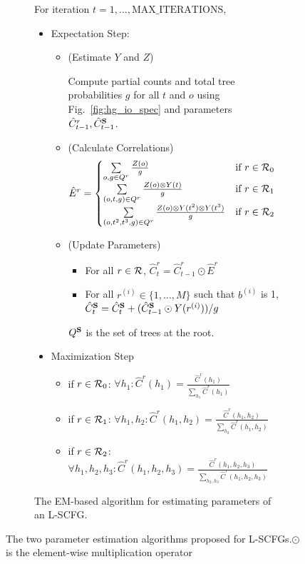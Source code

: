 \documentclass[11pt]{article}
\newcommand{\rione}{r^{(i)}}
\newcommand{\rules}{{\cal R}}
\newcommand{\e}[1]{\hat{#1}}
\newcommand{\bS}{{\bf S}}
\begin{document}
\begin{figure*}[t!]
{\begin{footnotesize}
\begin{subfigure}{1.05\columnwidth}
	For iteration $t=1, \dots, \textrm{MAX\_ITERATIONS}$, 
	\begin{itemize}			
		\item Expectation Step: 
		 \begin{itemize}[label={}]
			\item (Estimate $Y$ and $Z$) 
			
			Compute partial counts and total tree probabilities $g$ for all $t$ and $o$ using Fig.~\ref{fig:hg_io_spec} and parameters $\e{C}_{t-1}^r, \e{C}_{t-1}^\bS$.  
			\item (Calculate Correlations) 
				\begin{align*}
					\e{E}^r &= \begin{cases}
					\sum\limits_{o, g \in Q^r} \frac{Z(o)}{g} &\textrm{if }r \in \rules_0 \\
					\sum\limits_{\left(o, t, g\right) \in Q^r} \frac{Z(o) \otimes Y(t)}{g} &\textrm{if }r \in \rules_1 \\
					\sum\limits_{\left(o,t^2,t^3,g\right) \in Q^r} \frac{Z(o) \otimes Y(t^2) \otimes Y(t^3)}{g} &\textrm{if }r \in \rules_2 
					\end{cases}
				\end{align*}
			\item (Update Parameters)
		 	\begin{itemize}[label={}]
		 		\item For all $r \in \rules$, $\e{C}^r_t = \e{C}^r_{t-1} \odot \e{E}^r$
		 		\item For all $\rione \in \{1, \dots, M\}$ such that $b^{(i)}$ is 1, $\e{C}^\bS_t = \e{C}^\bS_t + (\e{C}^\bS_{t-1} \odot Y(\rione)) / g $
		 	\end{itemize}
		 	$Q^\bS$ is the set of trees at the root.
		\end{itemize}
		\item Maximization Step
			\begin{itemize}[label={},nolistsep]%
				\item if $r \in \rules_0$: $\forall h_1: \e{C}^r(h_1) = \frac{\e{C}^r(h_1)}{\sum_{h_1}\e{C}^r(h_1)}$ 
				\item if $r \in \rules_1$: $\forall h_1, h_2: \e{C}^r(h_1, h_2) = \frac{\e{C}^r(h_1, h_2)}{\sum_{h_2}\e{C}^r(h_1, h_2)}$ 
				\item if $r \in \rules_2$: $\forall h_1, h_2, h_3: \e{C}^r(h_1, h_2, h_3) = \frac{\e{C}^r(h_1, h_2, h_3)}{\sum_{h_2, h_3}\e{C}^r(h_1, h_2, h_3)}$ 
			\end{itemize}
	\end{itemize}		
	\caption{\small The EM-based algorithm for estimating parameters of an L-SCFG.}
	\label{fig:emlearn}	
	\end{subfigure}		
	\end{footnotesize}}
	\caption{The two parameter estimation algorithms proposed for L-SCFGs.$\odot$ is the element-wise multiplication operator}
	\label{fig:estimation-algos}
\end{figure*}
\end{document}
